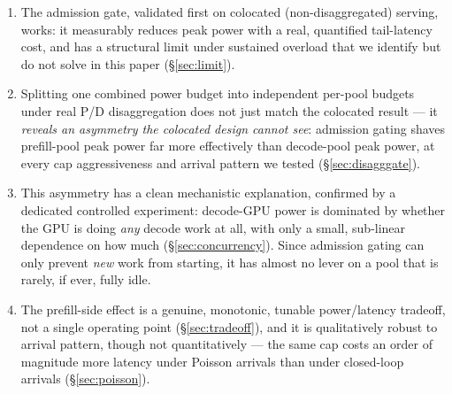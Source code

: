 \documentclass[sigconf,review,anonymous]{acmart}
\begin{document}
\begin{enumerate}[leftmargin=*]
  \item The admission gate, validated first on colocated (non-disaggregated) serving, works:
    it measurably reduces peak power with a real, quantified tail-latency cost, and has a
    structural limit under sustained overload that we identify but do not solve in this paper
    (\S\ref{sec:limit}).
  \item Splitting one combined power budget into independent per-pool budgets under real P/D
    disaggregation does not just match the colocated result --- it \emph{reveals an asymmetry
    the colocated design cannot see}: admission gating shaves prefill-pool peak power far
    more effectively than decode-pool peak power, at every cap aggressiveness and arrival
    pattern we tested (\S\ref{sec:disagggate}).
  \item This asymmetry has a clean mechanistic explanation, confirmed by a dedicated
    controlled experiment: decode-GPU power is dominated by whether the GPU is doing
    \emph{any} decode work at all, with only a small, sub-linear dependence on how much
    (\S\ref{sec:concurrency}). Since admission gating can only prevent \emph{new} work from
    starting, it has almost no lever on a pool that is rarely, if ever, fully idle.
  \item The prefill-side effect is a genuine, monotonic, tunable power/latency tradeoff, not
    a single operating point (\S\ref{sec:tradeoff}), and it is qualitatively robust to
    arrival pattern, though not quantitatively --- the same cap costs an order of magnitude
    more latency under Poisson arrivals than under closed-loop arrivals (\S\ref{sec:poisson}).
\end{enumerate}
\end{document}
